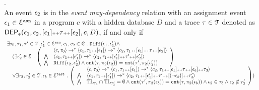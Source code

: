 \begin{defn}.
\label{def:event_dep}
\\ 
  An event $\mathtt{\epsilon}_2$ is in the \emph{event may-dependency} relation with an assignment
  event $\mathtt{\epsilon}_1 \in \mathcal{E}^{\mathtt{{asn}}}$ in a program ${c}$
  with a hidden database $D$ and a trace $\mathtt{\tau} \in \mathcal{T}$ denoted as 
  $\mathsf{DEP_{\mathtt{e}}}(\mathtt{\epsilon}_1, \mathtt{\epsilon}_2, [\mathtt{\epsilon}_1 ] {\scriptscriptstyle ++} \mathtt{\tau} {\scriptscriptstyle ++} [\mathtt{\epsilon}_2], c, D)$, if and only if
  \[
    \begin{array}{l}
  \exists \vtrace_0,
  \vtrace_1, \vtrace' \in \mathcal{T},\event_1' \in \eventset^{\asn}, {c}_1, {c}_2  \in \cdom  \st
  \diff(\event_1, \event_1') \land 
      \\ \quad
      (
        \exists  \event_2' \in \eventset \st 
    \left(
    \begin{array}{ll}   
   & \config{{c}, \vtrace_0} \rightarrow^{*} 
  \config{{c}_1, \vtrace_1 \tracecat [\event_1]}  \rightarrow^{*} 
    \config{{c}_2,  \vtrace_1 \tracecat [\event_1] \tracecat \vtrace \tracecat [\event_2] } 
   \\ 
   \bigwedge &
    \config{{c}_1, \vtrace_1 \tracecat [\event_1']}  \rightarrow^{*} 
    \config{{c}_2,  \vtrace_1 \tracecat[ \event_1'] \tracecat \vtrace' \tracecat [\event_2'] } 
  \\
  \bigwedge & 
  \diff(\event_2,\event_2' ) \land 
  \vcounter(\vtrace, \pi_2(\event_2))
  = 
  \vcounter(\vtrace', \pi_2(\event_2'))\\
  \end{array}
  \right)
  \\ \quad
  \lor 
  \exists \vtrace_3, \vtrace_3'  \in \mathcal{T}, \event_b \in \eventset^{\test} \st 
  \left(
  \begin{array}{ll}   
    & \config{{c}, \vtrace_0} \rightarrow^{*} 
      \config{{c}_1, \vtrace_1 \tracecat [\event_1]}  \rightarrow^{*} 
      \config{c_2,  \vtrace_1 \tracecat [\event_1] \tracecat \trace \tracecat [\event_b] \tracecat  \trace_3} 
    \\ 
    \bigwedge &
    \config{{c}_1, \vtrace_1 \tracecat [\event_1']}  \rightarrow^{*} 
    \config{c_2,  \vtrace_1 \tracecat [\event_1'] \tracecat \trace' \tracecat [(\neg \event_b)] \tracecat \trace_3'} 
    \\
    \bigwedge &  \tlabel_{\trace_3} \cap \tlabel_{\trace_3'} = \emptyset
     \land \vcounter(\trace', \pi_2(\event_b)) = \vcounter(\trace, \pi_2(\event_b)) 
    \land \event_2 \in \trace_3
    \land \event_2 \not\in \trace_3'
  \end{array}
  \right)
  )
\end{array}
   \]
%
\end{defn}
